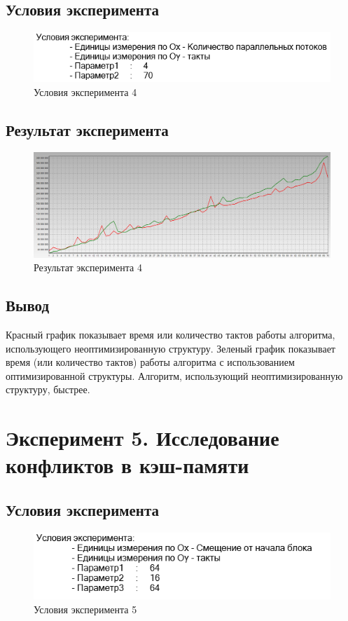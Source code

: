 \documentclass{article}
\begin{document}
\subsection{Условия эксперимента}
\begin{figure}[h]
	\centering
	\includegraphics[scale=0.7]{tools/in_4.png}
	\caption{Условия эксперимента 4}
\end{figure}

\subsection{Результат эксперимента}
\begin{figure}[h]
	\centering
	\includegraphics[scale=0.5]{tools/exp_4.png}
	\caption{Результат эксперимента 4}
\end{figure}

\subsection{Вывод}
Красный график показывает время или количество тактов работы алгоритма, использующего неоптимизированную  структуру. 
Зеленый график показывает время (или количество тактов) работы алгоритма с использованием оптимизированной структуры.
Алгоритм, использующий неоптимизированную структуру, быстрее.

\clearpage\section{Эксперимент 5. Исследование конфликтов в кэш-памяти}
\subsection{Условия эксперимента}
\begin{figure}[h]
	\centering
	\includegraphics[scale=0.7]{tools/in_5.png}
	\caption{Условия эксперимента 5}
\end{figure}
\end{document}
